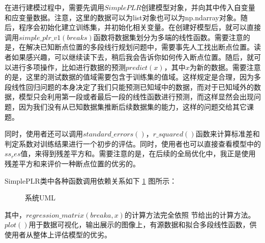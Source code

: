 在进行建模过程中，需要先调用$SimplePLR$创建模型对象，并向其中传入自变量和应变量数据。注意，这里的数据可以为list对象也可以为np.ndarray对象。随后，程序会初始化建立训练集，并初始化相关变量。在创建好模型后，就可以直接调用$simple\_plr\_v1(breaks)$函数将数据集划分为多端的线性函数。需要注意的是，在解决已知断点位置的多段线行规划问题中，需要事先人工找出断点位置。读者如果感兴趣，可以继续读下去，稍后我会告诉你如何传入断点位置。随后，就可以进行多项操作，比如进行数据的预测$predict(x)$，其中$x$为新的数据。需要注意的是，这里的测试数据的值域需要包含于训练集的值域。这样规定是合理，因为多段线性回归问题的本身决定了我们只能预测已知域中的数据，而对于已知域外的数据，模型只会利用第一段或者最后一段的线性函数进行预测，而这样显然会出现问题，因为我们没有从已知数据集推断后续数据集的能力，这样的问题交给其它课题。

同时，使用者还可以调用$standard\_errors()$，$r\_squared()$函数来计算标准差和判定系数对训练结果进行一个初步的评估。同时，使用者也可以直接查看模型中的$ss_res$值，来得到残差平方和。需要注意的是，在后续的全局优化中，我正是使用残差平方和来评价一种断点位置的优劣的。

SimplePLR类中各种函数调用依赖关系如下 \ref{image2} 图所示：

\begin{figure}[H]
    \caption{系统UML}
    \label{image2}      
\end{figure}

其中，$regression\_matrix(breaka,x)$的计算方法完全依照  节给出的计算方法。$plot()$用于数据可视化，输出展示的图像上，有源数据和拟合多段线性函数，供使用者从整体上评估模型的优劣。

